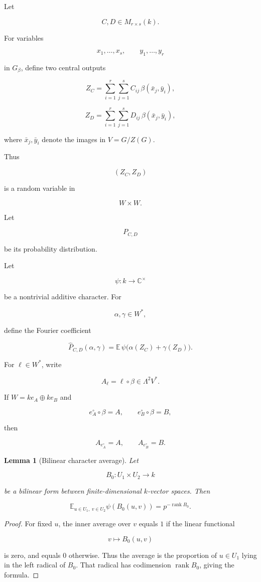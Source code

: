 \documentclass[11pt]{article}
\newtheorem{lemma}[theorem]{Lemma}
\begin{document}
Let

\[
C,D\in M_{r\times s}(k).
\]

For variables

\[
x_1,\ldots,x_s,\qquad y_1,\ldots,y_r
\]

in $G_\beta$, define two central outputs

\[
Z_C
=
\sum_{i=1}^{r}\sum_{j=1}^{s} C_{ij}\,\beta(\bar x_j,\bar y_i),
\]

\[
Z_D
=
\sum_{i=1}^{r}\sum_{j=1}^{s} D_{ij}\,\beta(\bar x_j,\bar y_i),
\]

where $\bar x_j,\bar y_i$ denote the images in $V=G/Z(G)$.

Thus

\[
(Z_C,Z_D)
\]

is a random variable in

\[
W\times W.
\]

Let

\[
P_{C,D}
\]

be its probability distribution.

Let

\[
\psi:k\to\mathbb C^\times
\]

be a nontrivial additive character. For

\[
\alpha,\gamma\in W^*,
\]

define the Fourier coefficient

\[
\widehat P_{C,D}(\alpha,\gamma)
=
\mathbb E\,
\psi\bigl(\alpha(Z_C)+\gamma(Z_D)\bigr).
\]

For $\ell\in W^*$, write

\[
A_\ell=\ell\circ\beta\in\Lambda^2V^*.
\]

If $W=k e_A\oplus k e_B$ and

\[
e_A^\circ\circ\beta=A,\qquad e_B^\circ\circ\beta=B,
\]

then

\[
A_{e_A^\circ}=A,\qquad A_{e_B^\circ}=B.
\]

\begin{lemma}[Bilinear character average]

Let

\[
B_0:U_1\times U_2\to k
\]

be a bilinear form between finite-dimensional $k$-vector spaces. Then

\[
\mathbb E_{u\in U_1,\ v\in U_2}
\psi(B_0(u,v))
=
p^{-\operatorname{rank}B_0}.
\]

\end{lemma}

\begin{proof}

For fixed $u$, the inner average over $v$ equals $1$ if the linear functional

\[
v\mapsto B_0(u,v)
\]

is zero, and equals $0$ otherwise. Thus the average is the proportion of $u\in U_1$ lying in the left radical of $B_0$. That radical has codimension $\operatorname{rank}B_0$, giving the formula.

\end{proof}
\end{document}
